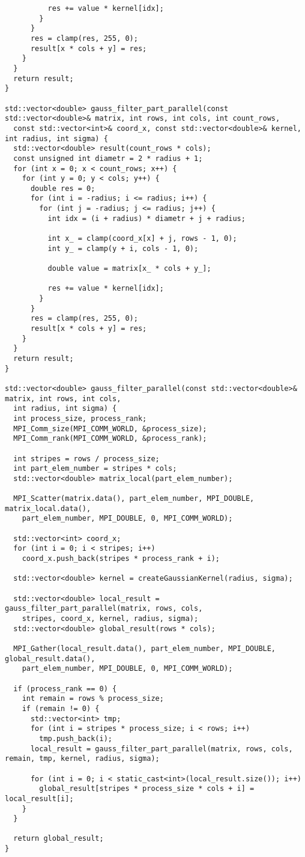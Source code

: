 \documentclass{report}
\begin{document}
\begin{lstlisting}
          res += value * kernel[idx];
        }
      }
      res = clamp(res, 255, 0);
      result[x * cols + y] = res;
    }
  }
  return result;
}

std::vector<double> gauss_filter_part_parallel(const std::vector<double>& matrix, int rows, int cols, int count_rows,
  const std::vector<int>& coord_x, const std::vector<double>& kernel, int radius, int sigma) {
  std::vector<double> result(count_rows * cols);
  const unsigned int diametr = 2 * radius + 1;
  for (int x = 0; x < count_rows; x++) {
    for (int y = 0; y < cols; y++) {
      double res = 0;
      for (int i = -radius; i <= radius; i++) {
        for (int j = -radius; j <= radius; j++) {
          int idx = (i + radius) * diametr + j + radius;

          int x_ = clamp(coord_x[x] + j, rows - 1, 0);
          int y_ = clamp(y + i, cols - 1, 0);

          double value = matrix[x_ * cols + y_];

          res += value * kernel[idx];
        }
      }
      res = clamp(res, 255, 0);
      result[x * cols + y] = res;
    }
  }
  return result;
}

std::vector<double> gauss_filter_parallel(const std::vector<double>& matrix, int rows, int cols,
  int radius, int sigma) {
  int process_size, process_rank;
  MPI_Comm_size(MPI_COMM_WORLD, &process_size);
  MPI_Comm_rank(MPI_COMM_WORLD, &process_rank);

  int stripes = rows / process_size;
  int part_elem_number = stripes * cols;
  std::vector<double> matrix_local(part_elem_number);

  MPI_Scatter(matrix.data(), part_elem_number, MPI_DOUBLE, matrix_local.data(),
    part_elem_number, MPI_DOUBLE, 0, MPI_COMM_WORLD);

  std::vector<int> coord_x;
  for (int i = 0; i < stripes; i++)
    coord_x.push_back(stripes * process_rank + i);

  std::vector<double> kernel = createGaussianKernel(radius, sigma);

  std::vector<double> local_result = gauss_filter_part_parallel(matrix, rows, cols,
    stripes, coord_x, kernel, radius, sigma);
  std::vector<double> global_result(rows * cols);

  MPI_Gather(local_result.data(), part_elem_number, MPI_DOUBLE, global_result.data(),
    part_elem_number, MPI_DOUBLE, 0, MPI_COMM_WORLD);

  if (process_rank == 0) {
    int remain = rows % process_size;
    if (remain != 0) {
      std::vector<int> tmp;
      for (int i = stripes * process_size; i < rows; i++)
        tmp.push_back(i);
      local_result = gauss_filter_part_parallel(matrix, rows, cols, remain, tmp, kernel, radius, sigma);

      for (int i = 0; i < static_cast<int>(local_result.size()); i++)
        global_result[stripes * process_size * cols + i] = local_result[i];
    }
  }

  return global_result;
}

\end{lstlisting}
\end{document}
